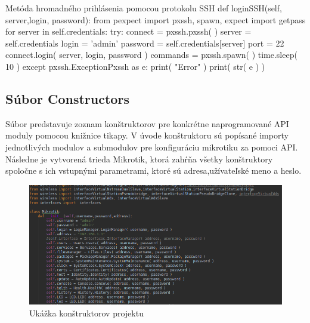 \begin{sexylisting}{Metóda hromadného prihlásenia pomocou protokolu SSH}
def loginSSH(self, server,login, password):
 from pexpect import pxssh, spawn, expect
 import getpass
 for server in self.credentials:
 try:
  connect = pxssh.pxssh( )
  server = self.credentials
  login = 'admin'
  password = self.credentials[server]
  port = 22
  connect.login( server, login, password )
  commands = pxssh.spawn( )
  time.sleep( 10 )
 except pxssh.ExceptionPxssh as e:
  print( "Error" )
  print( str( e ) )
\end{sexylisting}
\subsection{Súbor Constructors}
Súbor predstavuje zoznam konštruktorov pre konkrétne naprogramované API moduly pomocou knižnice tikapy. V úvode konštruktoru sú popísané importy jednotlivých modulov a submodulov pre konfiguráciu mikrotiku za pomoci API. \\
Následne je vytvorená trieda Mikrotik, ktorá zahŕňa všetky konštruktory spoločne s ich vstupnými parametrami, ktoré sú adresa,užívateľské meno a heslo. 
\begin{figure}[H]
\centering
\includegraphics[scale=0.5]{../text/constructors.png}
\caption{Ukážka konštruktorov projektu}
\label{fig:constructors}
\end{figure} 
